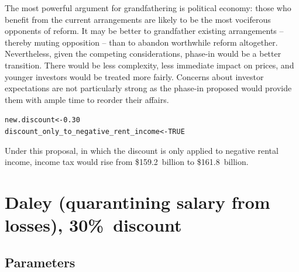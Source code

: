 \documentclass{grattan}\usepackage[]{graphicx}\usepackage[]{color}
\makeatletter
\newcommand{\hlnum}[1]{\textcolor[rgb]{0.686,0.059,0.569}{#1}}%
\newcommand{\hlstd}[1]{\textcolor[rgb]{0.345,0.345,0.345}{#1}}%
\newcommand{\hlkwb}[1]{\textcolor[rgb]{0.69,0.353,0.396}{#1}}%
\newenvironment{kframe}{%
 \def\at@end@of@kframe{}%
 \ifinner\ifhmode%
  \def\at@end@of@kframe{\end{minipage}}%
  \begin{minipage}{\columnwidth}%
 \fi\fi%
 \def\FrameCommand##1{\hskip\@totalleftmargin \hskip-\fboxsep
 \colorbox{shadecolor}{##1}\hskip-\fboxsep
     \hskip-\linewidth \hskip-\@totalleftmargin \hskip\columnwidth}%
 \MakeFramed {\advance\hsize-\width
   \@totalleftmargin\z@ \linewidth\hsize
   \@setminipage}}%
 {\par\unskip\endMakeFramed%
 \at@end@of@kframe}
\newenvironment{knitrout}{}{} %
\makeatother
\begin{document}
The most powerful argument for grandfathering is political economy: those who benefit from the current arrangements are likely to be the most vociferous opponents of reform. It may be better to grandfather existing arrangements -- thereby muting opposition -- than to abandon worthwhile reform altogether.  
Nevertheless, given the competing considerations, phase-in would be a better transition. There would be less complexity, less immediate impact on prices, and younger investors would be treated more fairly. Concerns about investor expectations are not particularly strong as the phase-in proposed would provide them with ample time to reorder their affairs.

\onecolumn
\begin{knitrout}
\color{fgcolor}\begin{kframe}
\begin{alltt}
\hlstd{new.discount} \hlkwb{<-} \hlnum{0.30}
\hlstd{discount_only_to_negative_rent_income} \hlkwb{<-} \hlnum{TRUE}
\end{alltt}
\end{kframe}
\end{knitrout}


Under this proposal, in which the discount is only applied to negative rental income, income tax would rise from \$159.2~billion to \$161.8~billion.

\section{Daley (quarantining salary from losses), 30\%\ discount}
\subsection{Parameters}
\end{document}
